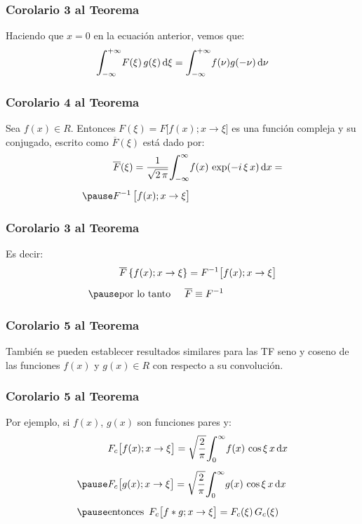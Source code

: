 \begin{frame}
\frametitle{Corolario 3 al Teorema}
Haciendo que $x = 0$ en la ecuación anterior, vemos que:
\pause
\begin{align}
\scaleint{6ex}_{\bs -\infty}^{+\infty} F (\xi) \, g (\xi) \dd{\xi} = \scaleint{6ex}_{\bs -\infty}^{+\infty} f (\nu) g (-\nu) \dd{\nu}
\label{eq:ecuacion_01_26}
\end{align}
\end{frame}
\begin{frame}
\frametitle{Corolario 4 al Teorema}
Sea $f (x) \in R$. \pause Entonces $F (\xi) = F \big[f (x); x \to \xi\big]$ es una función compleja y su conjugado, escrito como $\overline{F}(\xi)$ está dado por:
\pause
\begin{eqnarray*}
\begin{aligned}
&\overline{F}(\xi) = \dfrac{1}{\sqrt{2 \, \pi}} \scaleint{6ex}_{\bs -\infty}^{\infty} f (x) \, \exp(-i \, \xi \, x) \dd{x} = \\[0.5em] \pause
&F^{-1} \, \big[f (x); x \to \xi\big] 
\end{aligned}
\end{eqnarray*}
\end{frame}
\begin{frame}
\frametitle{Corolario 3 al Teorema}
Es decir:
\pause
\begin{eqnarray}
\begin{aligned}[b]
&\overline{F} \left\{f (x); x \to \xi \right\} = F^{-1} \big[f (x); x \to \xi \big] \\[0.5em] \pause
&\mbox{por lo tanto} \hspace{0.5cm} \overline{F} \equiv F^{-1}
\end{aligned}
\label{eq:ecuacion_01_27}
\end{eqnarray}
\end{frame}
\begin{frame}
\frametitle{Corolario 5 al Teorema}
También se pueden establecer resultados similares para las TF seno y coseno de las funciones $f (x)$ y $g (x) \in R$ con respecto a su convolución.
\end{frame}
\begin{frame}
\frametitle{Corolario 5 al Teorema}
Por ejemplo, si $f (x)$, $g (x)$ son funciones pares y:
\pause
\begin{eqnarray}
\begin{aligned}[b]
&F_{c} \big[f (x); x \to \xi \big] = \sqrt{\dfrac{2}{\pi}} \scaleint{6ex}_{\bs 0}^{\infty} f (x) \, \cos \xi \, x \dd{x} \\[0.5em] \pause
&F_{c} \big[g (x); x \to \xi \big] = \sqrt{\dfrac{2}{\pi}} \scaleint{6ex}_{\bs 0}^{\infty} g (x) \, \cos \xi \, x \dd{x} \\[0.5em] \pause
&\mbox{entonces} \hspace{0.5em} F_{c} \big[f * g; x \to \xi \big] = F_{c}(\xi) \, G_{c}(\xi)
\end{aligned}
\label{eq:ecuacion_01_28}
\end{eqnarray}
\end{frame}
